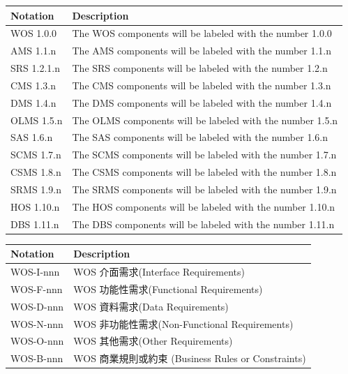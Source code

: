 \documentclass[a4paper, 12pt]{article}
\begin{document}
\newcommand{\notationDescTableCol}{ | p{6.5em} | p{32em} |}

\noindent \begin{tabular}{ | p{6.5em} | p{32em} |}
  \hline
  Notation & Description \\
  \hline
  WOS 1.0.0 & The WOS components will be labeled with the number 1.0.0 \\
  AMS 1.1.n & The AMS components will be labeled with the number 1.1.n \\
  SRS 1.2.1.n & The SRS components will be labeled with the number 1.2.n \\
  CMS 1.3.n & The CMS components will be labeled with the number 1.3.n \\
  DMS 1.4.n & The DMS components will be labeled with the number 1.4.n \\
  OLMS 1.5.n & The OLMS components will be labeled with the number 1.5.n \\
  SAS 1.6.n & The SAS components will be labeled with the number 1.6.n \\
  SCMS 1.7.n & The SCMS components will be labeled with the number 1.7.n \\
  CSMS 1.8.n & The CSMS components will be labeled with the number 1.8.n \\
  SRMS 1.9.n & The SRMS components will be labeled with the number 1.9.n \\
  HOS 1.10.n & The HOS components will be labeled with the number 1.10.n \\
  DBS 1.11.n & The DBS components will be labeled with the number 1.11.n \\
  \hline
\end{tabular} \par

\noindent \begin{tabular}{ | p{6.5em} | p{32em} |}
  \hline
  Notation & Description \\
  \hline
  WOS-I-nnn & WOS 介面需求(Interface Requirements) \\
  WOS-F-nnn & WOS 功能性需求(Functional Requirements) \\
  WOS-D-nnn & WOS 資料需求(Data Requirements) \\
  WOS-N-nnn & WOS 非功能性需求(Non-Functional Requirements) \\
  WOS-O-nnn & WOS 其他需求(Other Requirements) \\
  WOS-B-nnn & WOS 商業規則或約束 (Business Rules or Constraints) \\
  \hline
\end{tabular} \par
\end{document}
